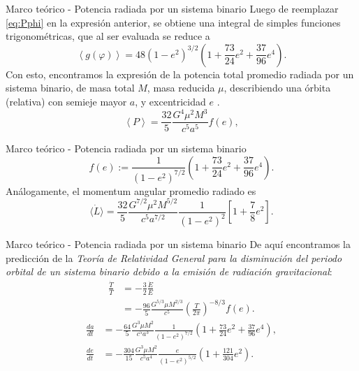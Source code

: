 \begin{frame}{Marco teórico - Potencia radiada por un sistema binario}
Luego de reemplazar \ref{eq:Pphi} en la expresión anterior, se obtiene una integral de simples funciones trigonométricas, que al ser evaluada se reduce a
\begin{equation*}
    \left\langle g(\varphi)\right\rangle= 48(1-e^2)^{3/2}\left(1+\frac{73}{24}e^2+\frac{37}{96}e^4\right).
    \end{equation*}
    Con esto, encontramos la expresión de la potencia total promedio radiada por un sistema binario, de masa total $M$, masa reducida $\mu$, describiendo una órbita (relativa) con semieje mayor $a$, y excentricidad $e$ \cite{PhysRev.131.435}.
    \begin{equation}\label{eq:PSbin}
    \left\langle P\right\rangle =\frac{32}{5}\frac{G^4\mu^2M^3}{c^5a^5}f(e),
    \end{equation}
\end{frame}
\begin{frame}{Marco teórico - Potencia radiada por un sistema binario}
    \begin{equation*}
        f(e):=\frac{1}{\left(1-e^2\right)^{7/2}}\left(1+\frac{73}{24}e^2+\frac{37}{96}e^4\right).
        \end{equation*}
        Análogamente, el momentum angular promedio radiado es
        \begin{equation*}
        \langle\dot{L}\rangle=\frac{32}{5}\frac{G^{7/2}\mu^{2}M^{5/2}}{c^5a^{7/2}}\frac{1}{(1-e^{2})^{2}}\left[1+\displaystyle\frac{7}{8}e^{2}\right].
        \end{equation*}
\end{frame}
\begin{frame}{Marco teórico - Potencia radiada por un sistema binario}
De aquí encontramos la predicción de la \textit{Teoría de Relatividad General para la disminución del periodo orbital de un sistema binario debido a la emisión de radiación gravitacional}:
\begin{align*}
\frac{\dot{T}}{T} &= -\frac{3}{2}\frac{\dot{E}}{E} \\
&= -\frac{96}{5} \frac{G^{5/3}\mu M^{2/3}}{c^5}\left(\frac{T}{2\pi}\right)^{-8/3}f(e).
\end{align*}
\vspace{-0.7cm}
\begin{align}
\frac{da}{dt} &= -\frac{64}{5}\frac{G^3\mu M^2}{c^5a^3}\frac{1}{\left(1-e^2\right)^{7/2}}\left(1+\frac{73}{24}e^2+\frac{37}{96}e^4\right) \label{eq:dadt},\\
\frac{de}{dt} &= -\frac{304}{15}\frac{G^3\mu M^2}{c^5a^4}\frac{e}{\left(1-e^2\right)^{5/2}}\left(1+\frac{121}{304}e^2\right). \label{eq:dedt}
\end{align}
\end{frame}
